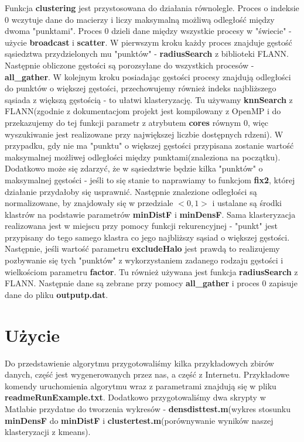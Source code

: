 \documentclass[a4paper,10pt,table]{article}
\begin{document}
Funkcja \textbf{clustering} jest przystosowana do działania równolegle. Proces o indeksie 0 wczytuje dane do macierzy i liczy maksymalną możliwą odległość między dwoma "punktami". Proces 0 dzieli dane między wszystkie procesy w "świecie" - użycie \textbf{broadcast} i \textbf{scatter}. W pierwszym kroku każdy proces znajduje gęstość sąsiedztwa przydzielonych mu "punktów" - \textbf{radiusSearch} z biblioteki FLANN. Następnie obliczone gęstości są porozsyłane do wszystkich procesów - \textbf{all\_gather}. W kolejnym kroku posiadając gęstości procesy znajdują odległości do punktów o większej gęstości, przechowujemy również indeks najbliższego sąsiada z większą gęstością - to ułatwi klasteryzację. Tu używamy \textbf{knnSearch} z FLANN(zgodnie z dokumentacjom projekt jest kompilowany z OpenMP i do przekazujemy do tej funkcji parametr z atrybutem \textbf{cores} równym 0, więc wyszukiwanie jest realizowane przy największej liczbie dostępnych rdzeni). W przypadku, gdy nie ma "punktu" o większej gęstości przypisana zostanie wartość maksymalnej możliwej odległości między punktami(znaleziona na początku). Dodatkowo może się zdarzyć, że w sąsiedztwie będzie kilka "punktów" o maksymalnej gęstości - jeśli to się stanie to naprawiamy to funkcjom \textbf{fix2}, której działanie przydałoby się usprawnić. Następnie znalezione odległości są normalizowane, by znajdowały się w przedziale $<0,1>$ i ustalane są środki klastrów na podstawie parametrów \textbf{minDistF} i \textbf{minDensF}. Sama klasteryzacja realizowana jest w miejscu przy pomocy funkcji rekurencyjnej - "punkt" jest przypisany do tego samego klastra co jego najbliższy sąsiad o większej gęstości. Następnie, jeśli wartość parametru \textbf{excludeHalo} jest prawdą to realizujemy pozbywanie się tych "punktów" z wykorzystaniem zadanego rodzaju gęstości i wielkościom parametru \textbf{factor}. Tu również używana jest funkcja \textbf{radiusSearch} z FLANN. Następnie dane są zebrane przy pomocy \textbf{all\_gather} i proces 0 zapisuje dane do pliku \textbf{outputp.dat}. 
\newpage
\section{Użycie}
Do przedstawienie algorytmu przygotowaliśmy kilka przykładowych zbirów danych, część jest wygenerowanych przez nas, a część z Internetu. Przykładowe komendy uruchomienia algorytmu wraz z parametrami znajdują się w pliku \textbf{readmeRunExample.txt}. Dodatkowo przygotowaliśmy dwa skrypty w Matlabie przydatne do tworzenia wykresów - \textbf{densdisttest.m}(wykres stosunku \textbf{minDensF} do \textbf{minDistF} i \textbf{clustertest.m}(porównywanie wyników naszej klasteryzacji z kmeans).
\end{document}
